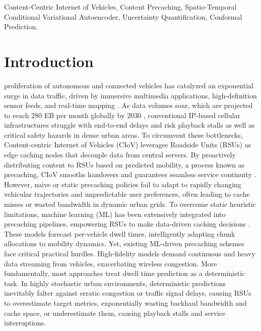 \documentclass[journal]{IEEEtran}
\begin{document}
\begin{IEEEkeywords}
Content-Centric Internet of Vehicles, Content Precaching, Spatio-Temporal Conditional Variational Autoencoder, Uncertainty Quantification, Conformal Prediction.
\end{IEEEkeywords}

\IEEEpeerreviewmaketitle

\section{Introduction} \label{sec:introduction}
 proliferation of autonomous and connected vehicles has catalyzed an exponential surge in data traffic, driven by immersive multimedia applications, high-definition sensor feeds, and real-time mapping \cite{Zhe2020, yuan2018}. 
As data volumes soar, which are projected to reach 280 EB per month globally by 2030 \cite{Ericsson}, conventional IP-based cellular infrastructures struggle with end-to-end delays and risk playback stalls as well as critical safety hazards in dense urban areas. 
To circumvent these bottlenecks, Content-centric Internet of Vehicles (CIoV) leverages Roadside Units (RSUs) as edge caching nodes that decouple data from central servers. 
By proactively distributing content to RSUs based on predicted mobility, a process known as precaching, CIoV smooths handovers and guarantees seamless service continuity \cite{Li2017, Hichri2021}. 
However, naive or static precaching policies fail to adapt to rapidly changing vehicular trajectories and unpredictable user preferences, often leading to cache misses or wasted bandwidth in dynamic urban grids.
To overcome static heuristic limitations, machine learning (ML) has been extensively integrated into precaching pipelines, empowering RSUs to make data-driven caching decisions \cite{Ding2022, Wu2022, AlNagar2022}. 
These models forecast per-vehicle dwell times, intelligently adapting chunk allocations to mobility dynamics. 
Yet, existing ML-driven precaching schemes face critical practical hurdles. 
High-fidelity models demand continuous and heavy data streaming from vehicles, exacerbating wireless congestion. 
More fundamentally, most approaches treat dwell time prediction as a deterministic task. 
In highly stochastic urban environments, deterministic predictions inevitably falter against erratic congestion or traffic signal delays, causing RSUs to overestimate target metrics, exponentially wasting backhaul bandwidth and cache space, or underestimate them, causing playback stalls and service interruptions.
\end{document}
